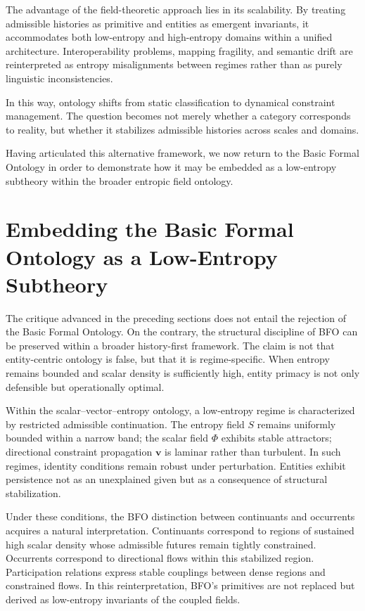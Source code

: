 \documentclass[12pt]{article}
\begin{document}
The advantage of the field-theoretic approach lies in its scalability. By treating admissible histories as primitive and entities as emergent invariants, it accommodates both low-entropy and high-entropy domains within a unified architecture. Interoperability problems, mapping fragility, and semantic drift are reinterpreted as entropy misalignments between regimes rather than as purely linguistic inconsistencies.

In this way, ontology shifts from static classification to dynamical constraint management. The question becomes not merely whether a category corresponds to reality, but whether it stabilizes admissible histories across scales and domains.

Having articulated this alternative framework, we now return to the Basic Formal Ontology in order to demonstrate how it may be embedded as a low-entropy subtheory within the broader entropic field ontology.

\section{Embedding the Basic Formal Ontology as a Low-Entropy Subtheory}

The critique advanced in the preceding sections does not entail the rejection of the Basic Formal Ontology. On the contrary, the structural discipline of BFO can be preserved within a broader history-first framework. The claim is not that entity-centric ontology is false, but that it is regime-specific. When entropy remains bounded and scalar density is sufficiently high, entity primacy is not only defensible but operationally optimal.

Within the scalar–vector–entropy ontology, a low-entropy regime is characterized by restricted admissible continuation. The entropy field $S$ remains uniformly bounded within a narrow band; the scalar field $\Phi$ exhibits stable attractors; directional constraint propagation $\mathbf{v}$ is laminar rather than turbulent. In such regimes, identity conditions remain robust under perturbation. Entities exhibit persistence not as an unexplained given but as a consequence of structural stabilization.

Under these conditions, the BFO distinction between continuants and occurrents acquires a natural interpretation. Continuants correspond to regions of sustained high scalar density whose admissible futures remain tightly constrained. Occurrents correspond to directional flows within this stabilized region. Participation relations express stable couplings between dense regions and constrained flows. In this reinterpretation, BFO’s primitives are not replaced but derived as low-entropy invariants of the coupled fields.
\end{document}
